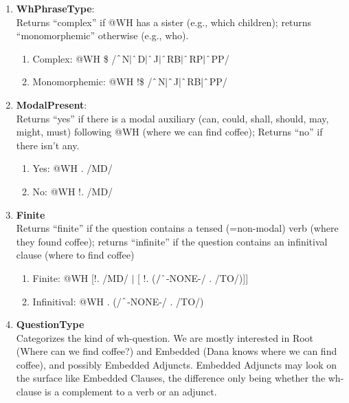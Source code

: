 \begin{enumerate}
    \item \textbf{WhPhraseType}: \\
    Returns ``complex'' if @WH has a sister (e.g., \textsf{which children}); returns ``monomorphemic'' otherwise (e.g., \textsf{who}).
        \begin{enumerate}  
            \item Complex: @WH \$ /$\string^$N$|\string^$D$|\string^$J$|\string^$RB$|\string^$RP$|\string^$PP/
            \item Monomorphemic: @WH !\$ /$\string^$N$|\string^$J$|\string^$RB$|\string^$PP/
        \end{enumerate}

    \item \textbf{ModalPresent}: \\
    Returns ``yes'' if there is a modal auxiliary (\textsf{can}, \textsf{could}, \textsf{shall}, \textsf{should}, \textsf{may}, \textsf{might}, \textsf{must}) following @WH (\textsf{where we can find coffee}); Returns ``no'' if there isn't any.
        \begin{enumerate}
            \item Yes: @WH . /MD/
            \item No: @WH !. /MD/
        \end{enumerate}
    
    \item \textbf{Finite}\\
    Returns ``finite'' if the question contains a tensed (=non-modal) verb (\textsf{where they found coffee}); returns ``infinite'' if the question contains an infinitival clause (\textsf{where to find coffee})
        \begin{enumerate}
            \item Finite: @WH [!. /MD/ $|$ [ !. ($/\string^$-NONE-/ . /TO/)]]
            \item Infinitival: @WH . (/$\string^$-NONE-/ . /TO/)
        \end{enumerate}
    
    \item \textbf{QuestionType}\\
    Categorizes the kind of wh-question. We are mostly interested in Root (\textsf{Where can we find coffee?}) and Embedded (Dana knows where we can find coffee), and possibly Embedded Adjuncts. Embedded Adjuncts may look on the surface like Embedded Clauses, the difference only being whether the wh-clause is a complement to a verb or an adjunct. 


\end{enumerate}
